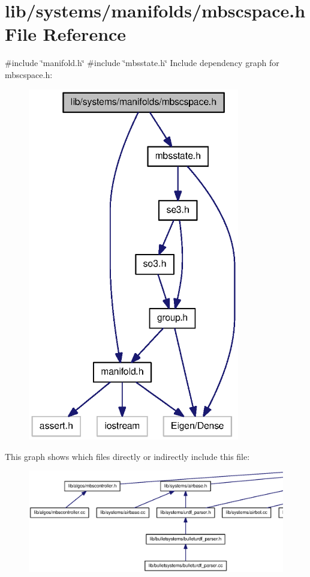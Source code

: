\section{lib/systems/manifolds/mbscspace.h \-File \-Reference}
\label{mbscspace_8h}
{\ttfamily \#include \char`\"{}manifold.\-h\char`\"{}}\*
{\ttfamily \#include \char`\"{}mbsstate.\-h\char`\"{}}\*
\-Include dependency graph for mbscspace.\-h\-:\nopagebreak
\begin{figure}[H]
\begin{center}
\leavevmode
\includegraphics[width=262pt]{mbscspace_8h__incl}
\end{center}
\end{figure}
\-This graph shows which files directly or indirectly include this file\-:
\nopagebreak
\begin{figure}[H]
\begin{center}
\leavevmode
\includegraphics[width=350pt]{mbscspace_8h__dep__incl}
\end{center}
\end{figure}
